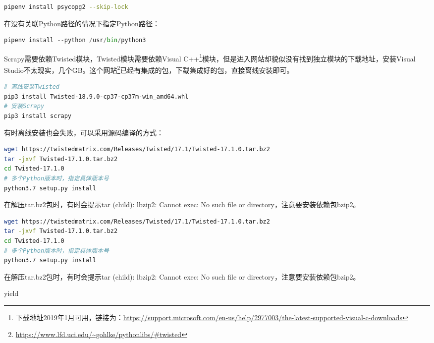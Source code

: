 \documentclass[8pt]{book}
\makeatletter
\numberwithin{dummy}{section}
\theoremstyle{ocrenumbox}
\theoremstyle{blacknumex}
\theoremstyle{blacknumbox}
\theoremstyle{ocrenum}
\renewcommand{\subsection}{\@startsection {subsection}{2}{\z@}
	{-3ex \@plus -0.1ex \@minus -.4ex}
	{0.5ex \@plus.2ex }
	{\normalfont\sffamily\bfseries}}
\makeatother
\begin{document}
\begin{lstlisting}[language=Bash]
pipenv install psycopg2 --skip-lock
\end{lstlisting}

在没有关联Python路径的情况下指定Python路径：

\begin{lstlisting}[language=Python]
pipenv install --python /usr/bin/python3
\end{lstlisting}








Scrapy需要依赖Twisted模块，Twisted模块需要依赖Visual C++\footnote{下载地址2019年1月可用，链接为：\url{https://support.microsoft.com/en-us/help/2977003/the-latest-supported-visual-c-downloads}}模块，但是进入网站却貌似没有找到独立模块的下载地址，安装Visual Studio不太现实，几个GB。这个网站\footnote{\url{https://www.lfd.uci.edu/~gohlke/pythonlibs/\#twisted}}已经有集成的包，下载集成好的包，直接离线安装即可。

\begin{lstlisting}[language=Bash]
# 离线安装Twisted
pip3 install Twisted-18.9.0-cp37-cp37m-win_amd64.whl
# 安装Scrapy
pip3 install scrapy
\end{lstlisting}


有时离线安装也会失败，可以采用源码编译的方式：


\begin{lstlisting}[language=Bash]
wget https://twistedmatrix.com/Releases/Twisted/17.1/Twisted-17.1.0.tar.bz2
tar -jxvf Twisted-17.1.0.tar.bz2
cd Twisted-17.1.0
# 多个Python版本时，指定具体版本号
python3.7 setup.py install
\end{lstlisting}


在解压tar.bz2包时，有时会提示tar (child): lbzip2: Cannot exec: No such file or directory，注意要安装依赖包bzip2。


\begin{lstlisting}[language=Bash]
wget https://twistedmatrix.com/Releases/Twisted/17.1/Twisted-17.1.0.tar.bz2
tar -jxvf Twisted-17.1.0.tar.bz2
cd Twisted-17.1.0
# 多个Python版本时，指定具体版本号
python3.7 setup.py install
\end{lstlisting}

在解压tar.bz2包时，有时会提示tar (child): lbzip2: Cannot exec: No such file or directory，注意要安装依赖包bzip2。

\subsection{yield}
\end{document}
